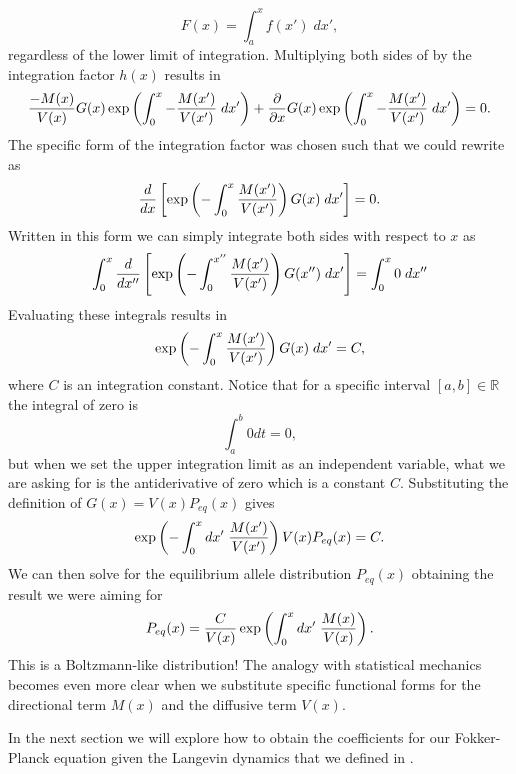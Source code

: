 \begin{equation}
  F(x) = \int_a^x f(x') \; dx',
\end{equation}
regardless of the lower limit of integration. Multiplying both sides of
 by the integration factor $h(x)$ results in
\begin{equation}
  {- M(x) \over V(x)} G(x)
  \exp \left( \int_0^x -{M(x') \over V(x')} \; dx' \right)
  + {\partial \over \partial x} G(x)
  \exp \left( \int_0^x -{M(x') \over V(x')} \; dx' \right)
  = 0.
  \label{eq_ode_int_fact}
\end{equation}
The specific form of the integration factor was chosen such that we could
rewrite  as
\begin{equation}
  {d \over dx}
  \left[
  \exp \left(
  - \int_0^x {M(x') \over V(x')}
  \right)G(x) \; dx'
  \right] = 0.
\end{equation}
Written in this form we can simply integrate both sides with respect to $x$ as
\begin{equation}
  \int_0^x {d \over dx''}\left[
  \exp \left(
  - \int_0^{x''} {M(x') \over V(x')}
  \right) G(x'')\; dx'
  \right] =
  \int_0^x 0 \; dx''
\end{equation}
Evaluating these integrals results in
\begin{equation}
  \exp \left(
  - \int_0^{x} {M(x') \over V(x')}
  \right) G(x)\; dx' = C,
\end{equation}
where $C$ is an integration constant. Notice that for a specific interval
$[a, b] \in \mathbb{R}$ the integral of zero is
\begin{equation}
  \int_a^b 0 dt = 0,
\end{equation}
but when we set the upper integration limit as an independent variable, what we
are asking for is the antiderivative of zero which is a constant $C$.
Substituting the definition of $G(x) = V(x) P_{eq}(x)$ gives
\begin{equation}
  \exp \left(
  - \int_0^x dx' \; {M(x') \over V(x')}\right)
  V(x) P_{eq}(x) = C.
\end{equation}
We can then solve for the equilibrium allele distribution $P_{eq}(x)$ obtaining
the result we were aiming for
\begin{equation}
  P_{eq}(x) = {C \over V(x)} \exp \left(
  \int_0^x dx' \; {M(x) \over V(x)}
  \right).
\end{equation}
This is a Boltzmann-like distribution! The analogy with statistical mechanics
becomes even more clear when we substitute specific functional forms for the
directional term $M(x)$ and the diffusive term $V(x)$.

In the next section we will explore how to obtain the coefficients for our
Fokker-Planck equation given the Langevin dynamics that we defined in
.